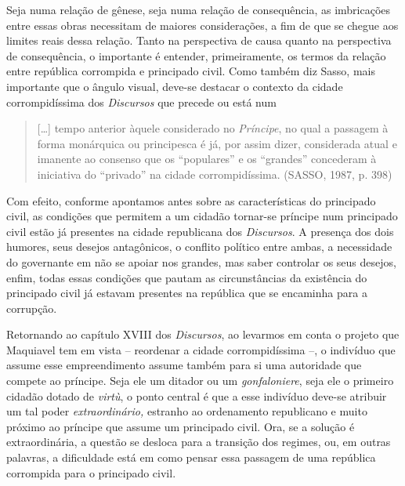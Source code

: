 Seja numa relação de gênese, seja numa relação de consequência, as
imbricações entre essas obras necessitam de maiores considerações, a fim
de que se chegue aos limites reais dessa relação. Tanto na perspectiva
de causa quanto na perspectiva de consequência, o importante é entender,
primeiramente, os termos da relação entre república corrompida e
principado civil. Como também diz Sasso, mais importante que o ângulo
visual, deve-se destacar o contexto da cidade corrompidíssima dos
\emph{Discursos} que precede ou está num

\begin{quote}
{[}\ldots{}{]} tempo anterior àquele considerado no \emph{Príncipe}, no
qual a passagem à forma monárquica ou principesca é já, por assim dizer,
considerada atual e imanente ao consenso que os ``populares'' e os
``grandes'' concederam à iniciativa do ``privado'' na cidade
corrompidíssima. (SASSO, 1987, p. 398)
\end{quote}

Com efeito, conforme apontamos antes sobre as características do
principado civil, as condições que permitem a um cidadão tornar-se
príncipe num principado civil estão já presentes na cidade republicana
dos \emph{Discursos}. A presença dos dois humores, seus desejos
antagônicos, o conflito político entre ambas, a necessidade do
governante em não se apoiar nos grandes, mas saber controlar os seus
desejos, enfim, todas essas condições que pautam as circunstâncias da
existência do principado civil já estavam presentes na república que se
encaminha para a corrupção.

Retornando ao capítulo XVIII dos \emph{Discursos}, ao levarmos em conta
o projeto que Maquiavel tem em vista -- reordenar a cidade
corrompidíssima --, o indivíduo que assume esse empreendimento assume
também para si uma autoridade que compete ao príncipe. Seja ele um
ditador ou um \emph{gonfaloniere}, seja ele o primeiro cidadão dotado de
\emph{virtù}, o ponto central é que a esse indivíduo deve-se atribuir um
tal poder \emph{extraordinário,} estranho ao ordenamento republicano e
muito próximo ao príncipe que assume um principado civil. Ora, se a
solução é extraordinária, a questão se desloca para a transição dos
regimes, ou, em outras palavras, a dificuldade está em como pensar essa
passagem de uma república corrompida para o principado civil.

